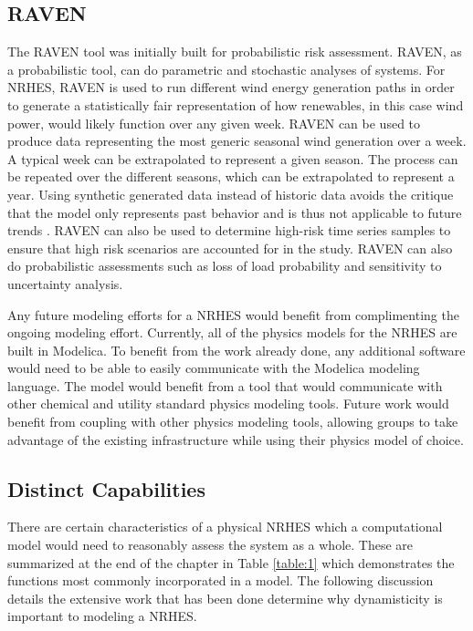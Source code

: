 \subsection{RAVEN}


The RAVEN tool was initially built for probabilistic risk assessment. RAVEN, as a probabilistic tool, can do parametric and stochastic analyses of systems\cite{RabitiRAVEN}. For NRHES, RAVEN is used to run different wind energy generation paths in order to generate a statistically fair representation of how renewables, in this case wind power, would likely function over any given week. RAVEN can be used to produce data representing the most generic seasonal wind generation over a week. A typical week can be extrapolated to represent a given season. The process can be repeated over the different seasons, which can be extrapolated to represent a year. Using synthetic generated data instead of historic data avoids the critique that the model only represents past behavior and is thus not applicable to future trends \cite{redfoot_epiney_2016}. RAVEN can also be used to determine high-risk time series samples to ensure that high risk scenarios are accounted for in the study. RAVEN can also do probabilistic assessments such as loss of load probability and sensitivity to uncertainty analysis.

Any future modeling efforts for a NRHES would benefit from complimenting the ongoing modeling effort. Currently, all of the physics models for the NRHES are built in Modelica. To benefit from the work already done, any additional software would need to be able to easily communicate with the Modelica modeling language.  The model would benefit from a tool that would communicate with other chemical and utility standard physics modeling tools. Future work would benefit from coupling with other physics modeling tools, allowing groups to take advantage of the existing infrastructure while using their physics model of choice.

\subsection{Distinct Capabilities}
There are certain characteristics of a physical NRHES which a computational model would need to reasonably assess the system as a whole. These are summarized at the end of the chapter in Table \ref{table:1} which demonstrates the functions most commonly incorporated in a model. The following discussion details the extensive work that has been done determine why dynamisticity is important to modeling a NRHES.

